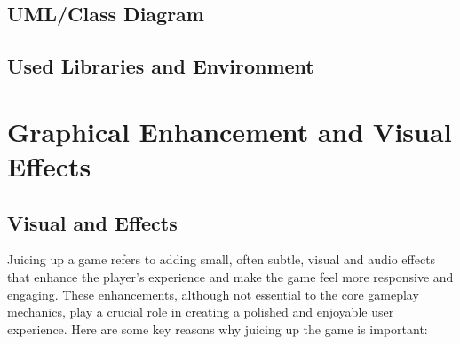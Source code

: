 \documentclass[conference]{IEEEtran}
\begin{document}
\subsection{UML/Class Diagram}

\subsection{Used Libraries and Environment}


\section{Graphical Enhancement and Visual Effects}
\label{sec:graphical_enhancement}

\subsection{Visual and Effects}

Juicing up a game\cite{reddit:gamejuice} refers to adding small, often subtle, visual and audio effects that enhance the player's experience and make the game feel more responsive and engaging. These enhancements, although not essential to the core gameplay mechanics, play a crucial role in creating a polished and enjoyable user experience. Here are some key reasons why juicing up the game is important:
\end{document}
